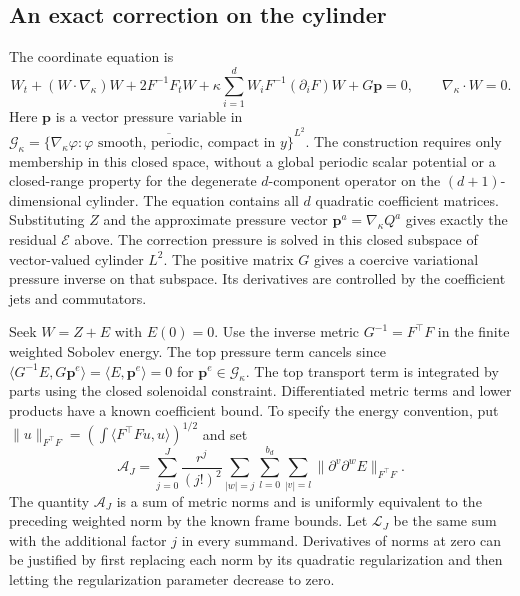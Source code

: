 \documentclass[11pt]{article}
\theoremstyle{definition}
\begin{document}
\subsection{An exact correction on the cylinder}
The coordinate equation is
\begin{equation}\label{eq:packet-coordinate-equation}
 W_t+(W\cdot\nabla_\kappa)W+2F^{-1}F_tW
    +\kappa\sum_{i=1}^d W_iF^{-1}(\partial_iF)W
    +G\mathbf p=0,
 \qquad \nabla_\kappa\cdot W=0.
\end{equation}
Here $\mathbf p$ is a vector pressure variable in
$\mathscr G_\kappa=\overline{\{\nabla_\kappa\varphi:
\varphi\text{ smooth, periodic, compact in }y\}}^{L^2}$.
The construction requires only membership in this closed space, without
a global periodic scalar potential or a closed-range property for the
degenerate $d$-component operator on the $(d+1)$-dimensional cylinder.
The equation contains all $d$ quadratic coefficient matrices.
Substituting $Z$ and the approximate pressure vector
$\mathbf p^a=\nabla_\kappa Q^a$ gives exactly the residual $\mathcal E$
above. The correction pressure is solved in this closed subspace of
vector-valued cylinder $L^2$.
The positive matrix $G$ gives a coercive variational pressure inverse on
that subspace. Its derivatives are controlled by the coefficient
jets and commutators.

Seek $W=Z+E$ with $E(0)=0$. Use the inverse metric
$G^{-1}=F^{\top}F$ in the finite weighted Sobolev energy. The top
pressure term cancels since
$\langle G^{-1}E,G\mathbf p^e\rangle
 =\langle E,\mathbf p^e\rangle=0$ for $\mathbf p^e\in\mathscr G_\kappa$.
The top transport term is integrated by parts using the closed
solenoidal constraint. Differentiated metric terms and lower products
have a known coefficient bound. To specify the energy convention, put
$\|u\|_{F^{\top}F}=(\int\langle F^{\top}Fu,u\rangle)^{1/2}$ and set
\[
 \mathcal A_J=\sum_{j=0}^J\frac{r^j}{(j!)^2}
   \sum_{|w|=j}\sum_{l=0}^{b_d}\sum_{|v|=l}
       \|\partial^v\partial^w E\|_{F^{\top}F}.
\]
The quantity $\mathcal A_J$ is a sum of metric norms and is
uniformly equivalent to the preceding weighted norm by the known frame
bounds. Let $\mathcal L_J$ be the same sum with the additional factor
$j$ in every summand. Derivatives of norms at zero can be justified by
first replacing each norm by its quadratic regularization and then
letting the regularization parameter decrease to zero.
\end{document}
